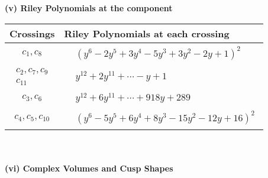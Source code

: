 \documentclass[1p]{elsarticle_modified}
\theoremstyle{definition}
\begin{document}
\newpage\renewcommand{\arraystretch}{1}
\flushleft \textbf{(v) Riley Polynomials at the component}\newline \\
\begin{tabular}{m{50pt}|m{274pt}}
Crossings & \hspace{64pt}Riley Polynomials at each crossing \\
\hline $$\begin{aligned}c_{1},c_{8}\end{aligned}$$&$\begin{aligned}
&(y^6-2 y^5+3 y^4-5 y^3+3 y^2-2 y+1)^2
\end{aligned}$\\
\hline $$\begin{aligned}c_{2},c_{7},c_{9}\\c_{11}\end{aligned}$$&$\begin{aligned}
&y^{12}+2 y^{11}+\cdots- y+1
\end{aligned}$\\
\hline $$\begin{aligned}c_{3},c_{6}\end{aligned}$$&$\begin{aligned}
&y^{12}+6 y^{11}+\cdots+918 y+289
\end{aligned}$\\
\hline $$\begin{aligned}c_{4},c_{5},c_{10}\end{aligned}$$&$\begin{aligned}
&(y^6-5 y^5+6 y^4+8 y^3-15 y^2-12 y+16)^2
\end{aligned}$\\
\hline
\end{tabular}\\~\\
\newpage\flushleft \textbf{(vi) Complex Volumes and Cusp Shapes}
\end{document}
